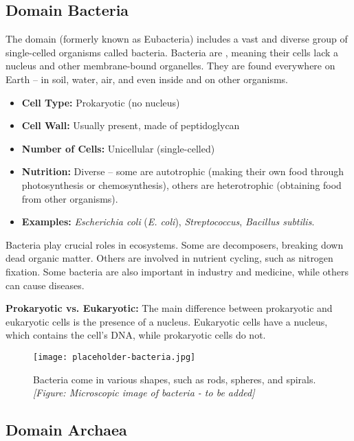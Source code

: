 \subsection{Domain Bacteria}

The domain  (formerly known as Eubacteria) includes a vast and diverse group of single-celled organisms called bacteria.  Bacteria are , meaning their cells lack a nucleus and other membrane-bound organelles.  They are found everywhere on Earth – in soil, water, air, and even inside and on other organisms.

\begin{itemize}
    \item \textbf{Cell Type:} Prokaryotic (no nucleus)
    \item \textbf{Cell Wall:} Usually present, made of peptidoglycan
    \item \textbf{Number of Cells:} Unicellular (single-celled)
    \item \textbf{Nutrition:}  Diverse – some are autotrophic (making their own food through photosynthesis or chemosynthesis), others are heterotrophic (obtaining food from other organisms).
    \item \textbf{Examples:} \textit{Escherichia coli} (\textit{E. coli}), \textit{Streptococcus}, \textit{Bacillus subtilis}.
\end{itemize}

Bacteria play crucial roles in ecosystems. Some are decomposers, breaking down dead organic matter. Others are involved in nutrient cycling, such as nitrogen fixation.  Some bacteria are also important in industry and medicine, while others can cause diseases.

\begin{marginnote}
\textbf{Prokaryotic vs. Eukaryotic:}  The main difference between prokaryotic and eukaryotic cells is the presence of a nucleus. Eukaryotic cells have a nucleus, which contains the cell's DNA, while prokaryotic cells do not.
\end{marginnote}

\begin{figure}
\centering
\texttt{[image: placeholder-bacteria.jpg]}
\caption{Bacteria come in various shapes, such as rods, spheres, and spirals. \textit{[Figure: Microscopic image of bacteria - to be added]}}
\end{figure}


\subsection{Domain Archaea}

